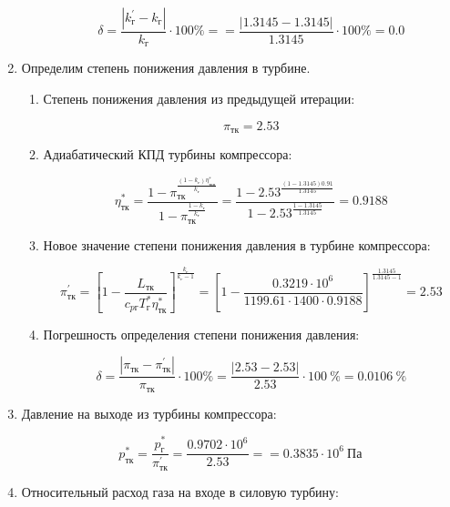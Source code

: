 \documentclass[a4paper,10pt]{article}
\begin{document}
\begin{enumerate}
\begin{enumerate}
		\[
		\delta = \frac{ \left| k_{г}^\prime - k_{г} \right| }{ k_{г} } \cdot 100 \% =
				= \frac{ \left| 1.3145 - 1.3145 \right| }{ 1.3145 } \cdot 100 \%
				= 0.0
		\]
	
	\end{enumerate}
	
	\item Определим степень понижения давления в турбине.
	
	\begin{enumerate}
		
		\item Степень понижения давления из предыдущей итерации:
		
		\[
		\pi_{тк} = 2.53
		\]
		
		\item Адиабатический КПД турбины компрессора:
		
		\[
		\eta_{тк}^* = \frac{1 - \pi_{тк} ^ 
	                   {\frac{\left(1 - k_г \right) \eta_{ткп}^*}{k_г}}
					}{
					   1 - \pi_{тк} ^ {\frac{1 - k_г}{k_г}} 
					} = 
				\frac{1 - 2.53 ^ 
	                   {\frac{\left(1 - 1.3145 \right) 0.91 }{ 1.3145 }}
					}{
					   1 - 2.53 ^ {\frac{ 1 - 1.3145 }{ 1.3145 }} 
					} = 
			0.9188
		\]	
		
		\item Новое значение степени понижения давления в турбине компрессора:
		
		\[
		\pi_{тк}^\prime = \left[ 
							1 - \frac{L_{тк}}{c_{pг} T_г^* \eta_{тк}^*}	
						\right] ^ 
							\frac{k_г}{k_г - 1} =
					\left[ 
						1 - \frac{ 
								0.3219 \cdot 10^6  
							}{ 
								1199.61 \cdot 1400 \cdot 0.9188
							}	
					\right] ^ 
						\frac{ 1.3145 }{ 1.3145 - 1} =
					2.53
		\]
		
		\item Погрешность определения степени понижения давления:
		
		\[
		\delta = \frac{ \left| \pi_{тк} - \pi_{тк}^\prime \right| }{ \pi_{тк} } \cdot 100 \% =
				\frac{ 
					\left| 2.53 - 2.53 \right|
				}{ 
					2.53 
				} \cdot 100\ \% = 
				0.0106\ \% 
		\]
	
	\end{enumerate}
	
	\item Давление на выходе из турбины компрессора:
	
	\[
	p_{тк}^* = \frac{ p_г^* }{ \pi_{тк}^\prime } = \frac{ 0.9702 \cdot 10^6 }{ 2.53 } = 
		= 0.3835 \cdot 10^6\ Па
	\]
	
	\item Относительный расход газа на входе в силовую турбину:
	

\end{enumerate}
\end{document}

